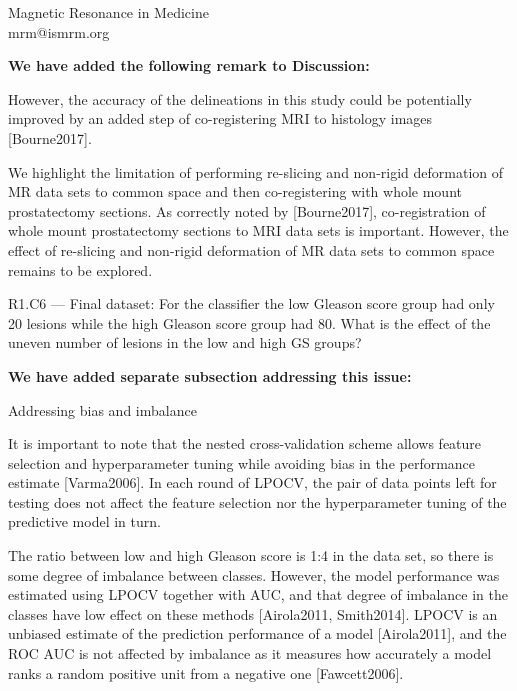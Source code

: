 \documentclass{letter}
\newenvironment{comment}[1]%
  {\vspace{5ex}\par\textsf{#1 ---} \ignorespaces}%
  {\par\ignorespacesafterend}
\newenvironment{reply}%
  {\vspace{2ex}\par\bfseries}%
  {\par\upshape}
\providecommand{\citep}[1]{[#1]}
\providecommand{\citet}[1]{[#1]}
\begin{document}
\begin{letter}{Magnetic Resonance in Medicine \\ mrm@ismrm.org}
\begin{reply}
We have added the following remark to Discussion:

However, the accuracy of the delineations in this study could be potentially
improved by an added step of co-registering MRI to histology images
\citep{Bourne2017}.

We highlight the limitation of performing re-slicing and non-rigid deformation
of MR data sets to common space and then co-registering with whole mount
prostatectomy sections. As correctly noted by \citet{Bourne2017},
co-registration of whole mount prostatectomy sections to MRI data sets is
important. However, the effect of re-slicing and non-rigid deformation of MR
data sets to common space remains to be explored.
\end{reply}


\begin{comment}{R1.C6}
Final dataset: For the classifier the low Gleason score group had only 20
lesions while the high Gleason score group had 80. What is the effect of the
uneven number of lesions in the low and high GS groups?
\end{comment}

\begin{reply}
We have added separate subsection addressing this issue:

Addressing bias and imbalance

It is important to note that the nested cross-validation scheme allows feature
selection and hyperparameter tuning while avoiding bias in the performance
estimate \citep{Varma2006}. In each round of LPOCV, the pair of data points left
for testing does not affect the feature selection nor the hyperparameter tuning
of the predictive model in turn.

The ratio between low and high Gleason score is 1:4 in the data set, so there is
some degree of imbalance between classes. However, the model performance was
estimated using LPOCV together with AUC, and that degree of imbalance in the
classes have low effect on these methods \citep{Airola2011, Smith2014}. LPOCV is
an unbiased estimate of the prediction performance of a model
\citep{Airola2011}, and the ROC AUC is not affected by imbalance as it measures
how accurately a model ranks a random positive unit from a negative one
\citep{Fawcett2006}.
\end{reply}




\end{letter}
\end{document}
